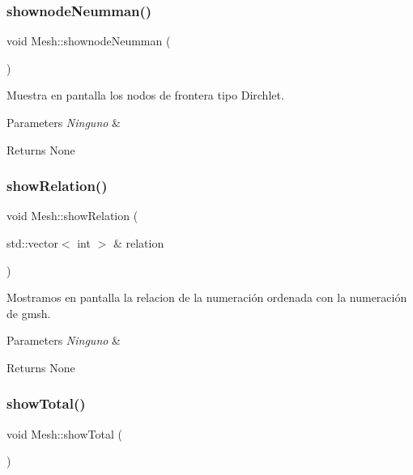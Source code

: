 \subsubsection{\texorpdfstring{shownode\+Neumman()}{shownodeNeumman()}}
{\footnotesize\ttfamily void Mesh\+::shownode\+Neumman (\begin{DoxyParamCaption}{ }\end{DoxyParamCaption})}



Muestra en pantalla los nodos de frontera tipo Dirchlet. 


\begin{DoxyParams}{Parameters}
{\em Ninguno} & \\
\hline
\end{DoxyParams}
\begin{DoxyReturn}{Returns}
None 
\end{DoxyReturn}
\hypertarget{class_mesh_a90fd6f1f7a64ff29d1eeee72c22142d2}{}\label{class_mesh_a90fd6f1f7a64ff29d1eeee72c22142d2} 
\subsubsection{\texorpdfstring{show\+Relation()}{showRelation()}}
{\footnotesize\ttfamily void Mesh\+::show\+Relation (\begin{DoxyParamCaption}\item[{std\+::vector$<$ int $>$ \&}]{relation }\end{DoxyParamCaption})}



Mostramos en pantalla la relacion de la numeración ordenada con la numeración de gmsh. 


\begin{DoxyParams}{Parameters}
{\em Ninguno} & \\
\hline
\end{DoxyParams}
\begin{DoxyReturn}{Returns}
None 
\end{DoxyReturn}
\hypertarget{class_mesh_a941977c20a68f58aa11d264fb30f3032}{}\label{class_mesh_a941977c20a68f58aa11d264fb30f3032} 
\subsubsection{\texorpdfstring{show\+Total()}{showTotal()}}
{\footnotesize\ttfamily void Mesh\+::show\+Total (\begin{DoxyParamCaption}{ }\end{DoxyParamCaption})}



